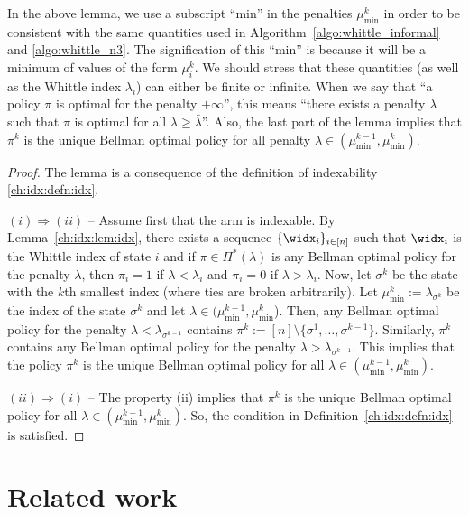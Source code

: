 In the above lemma, we use a subscript ``min'' in the penalties $\mu^{k}_{\min}$ in order to be consistent with the same quantities used in Algorithm~\ref{algo:whittle_informal} and \ref{algo:whittle_n3}.  The signification of this ``min'' is because it will be a minimum of values of the form $\mu^k_i$.  We should stress that these quantities (as well as the Whittle index $\lambda_i$) can either be finite or infinite. When we say that ``a policy $\pi$ is optimal for the penalty $+\infty$'', this means ``there exists a penalty $\bar{\lambda}$ such that $\pi$ is optimal for all $\lambda\ge\bar{\lambda}$''.  Also, the last part of the lemma implies that $\pi^k$ is the unique Bellman optimal policy for all penalty $\lambda\in(\mu^{k-1}_{\min}, \mu^{k}_{\min})$.

\begin{proof}
    The lemma is a consequence of the definition of indexability \ref{ch:idx:defn:idx}.

    $(i)\Rightarrow(ii)$ -- Assume first that the arm is indexable.
    By Lemma~\ref{ch:idx:lem:idx}, there exists a sequence $\{\widx_i\}_{i\in[n]}$ such that $\widx_i$ is the Whittle index of state $i$ and if $\pi\in\Pi^*(\lambda)$ is any Bellman optimal policy for the penalty $\lambda$, then $\pi_i=1$ if $\lambda<\lambda_i$ and $\pi_i=0$ if $\lambda>\lambda_i$.
    Now, let $\sigma^k$ be the state with the $k$th smallest index (where ties are broken arbitrarily).
    Let $\mu^k_{\min}:=\lambda_{\sigma^k}$ be the index of the state $\sigma^k$ and let $\lambda\in(\mu^{k-1}_{\min},\mu^{k}_{\min}$).
    Then, any Bellman optimal policy for the penalty $\lambda<\lambda_{\sigma^{k-1}}$ contains $\pi^{k}:=[n]\setminus\{\sigma^1,\dots, \sigma^{k-1}\}$.
    Similarly, $\pi^{k}$ contains any Bellman optimal policy for the penalty $\lambda>\lambda_{\sigma^{k-1}}$.
    This implies that the policy $\pi^{k}$ is the unique Bellman optimal policy for all $\lambda\in(\mu^{k-1}_{\min},\mu^{k}_{\min})$. 

    $(ii)\Rightarrow(i)$ -- The property (ii) implies that $\pi^k$ is the unique Bellman optimal policy for all $\lambda\in(\mu^{k-1}_{\min},\mu^k_{\min})$. 
    So, the condition in Definition~\ref{ch:idx:defn:idx} is satisfied.
\end{proof}




\section{Related work}


